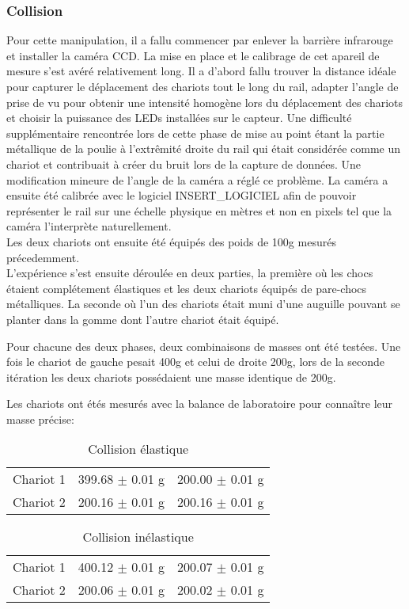 \subsubsection{Collision}
Pour cette manipulation, il a fallu commencer par enlever la barrière infrarouge et installer la caméra CCD.
La mise en place et le calibrage de cet apareil de mesure s'est avéré relativement long. Il a d'abord fallu trouver la distance idéale pour capturer le déplacement des chariots tout le long du rail, adapter l'angle de prise de vu pour obtenir une intensité homogène lors du déplacement des chariots et choisir la puissance des LEDs installées sur le capteur. Une difficulté supplémentaire rencontrée lors de cette phase de mise au point étant la partie métallique de la poulie à l'extrêmité droite du rail qui était considérée comme un chariot et contribuait à créer du bruit lors de la capture de données. Une modification mineure de l'angle de la caméra a réglé ce problème.
La caméra a ensuite été calibrée avec le logiciel INSERT\_LOGICIEL afin de pouvoir représenter le rail sur une échelle physique en mètres et non en pixels tel que la caméra l'interprète naturellement.\\
Les deux chariots ont ensuite été équipés des poids de 100g mesurés précedemment. \\

L'expérience s'est ensuite déroulée en deux parties, la première où les chocs étaient complétement élastiques et les deux chariots équipés de pare-chocs métalliques. La seconde où l'un des chariots était muni d'une auguille pouvant se planter dans la gomme dont l'autre chariot était équipé.

Pour chacune des deux phases, deux combinaisons de masses ont été testées. Une fois le chariot de gauche pesait 400g et celui de droite 200g, lors de la seconde itération les deux chariots possédaient une masse identique de 200g.

Les chariots ont étés mesurés avec la balance de laboratoire pour connaître leur masse précise:
\begin{table}[h]
\centering
\caption{Collision élastique}
\begin{tabular}{|l|l|l|}
\hline
Chariot 1 & 399.68 $\pm$ 0.01 g & 200.00 $\pm$ 0.01 g \\
Chariot 2 & 200.16 $\pm$ 0.01 g & 200.16 $\pm$ 0.01 g \\
\hline
\end{tabular}
\end{table}

\begin{table}[h]
\centering
\caption{Collision inélastique}
\begin{tabular}{|l|l|l|}
\hline
Chariot 1 & 400.12 $\pm$ 0.01 g & 200.07 $\pm$ 0.01 g \\
Chariot 2 & 200.06 $\pm$ 0.01 g & 200.02 $\pm$ 0.01 g \\
\hline
\end{tabular}
\end{table}


